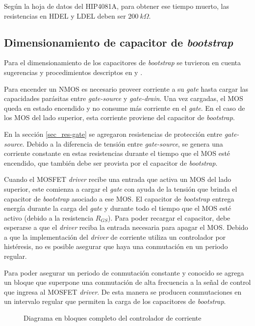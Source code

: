 \noindent Según la hoja de datos del HIP4081A, para obtener ese tiempo muerto, las resistencias en HDEL y LDEL deben ser $200\:k\Omega$.

\subsection{Dimensionamiento de capacitor de \textsl{bootstrap}}\label{sec_cap_bootstrap}

\noindent Para el dimensionamiento de los capacitores de \textsl{bootstrap} se tuvieron en cuenta sugerencias y procedimientos descriptos en \cite{HIP4081A_AN9405} y \cite{HIP4081A_FN3659}.

Para encender un NMOS es necesario proveer corriente a su \textsl{gate} hasta cargar las capacidades parásitas entre \textsl{gate-source} y \textsl{gate-drain}. Una vez cargadas, el MOS queda en estado encendido y no consume más corriente en el \textsl{gate}. En el caso de los MOS del lado superior, esta corriente proviene del capacitor de \textsl{bootstrap}.

En la sección \ref{sec_res-gate} se agregaron resistencias de protección entre \textsl{gate-source}. Debido a la diferencia de tensión entre \textsl{gate-source}, se genera una corriente constante en estas resistencias durante el tiempo que el MOS esté encendido, que también debe ser provista por el capacitor de \textsl{bootstrap}.

\noindent Cuando el MOSFET \textsl{driver} recibe una entrada que activa un MOS del lado superior, este comienza a cargar el \textsl{gate} con ayuda de la tensión que brinda el capacitor de \textsl{bootstrap} asociado a ese MOS. El capacitor de \textsl{bootstrap} entrega energía durante la carga del \textsl{gate} y durante todo el tiempo que el MOS esté activo (debido a la resistencia $R_{GS}$). Para poder recargar el capacitor, debe esperarse a que el \textsl{driver} reciba la entrada necesaria para apagar el MOS. Debido a que la implementación del \textsl{driver} de corriente utiliza un controlador por histéresis, no es posible asegurar que haya una conmutación en un periodo regular.

\noindent Para poder asegurar un periodo de conmutación constante y conocido se agrega un bloque que superpone una conmutación de alta frecuencia a la señal de control que ingresa al MOSFET \textsl{driver}. De esta manera se producen conmutaciones en un intervalo regular que permiten la carga de los capacitores de \textsl{bootstrap}. 

\begin{figure}[H]
	\centering
	\scalebox{0.8}{}
	\caption{Diagrama en bloques completo del controlador de corriente}	\label{fig:img_diag-en-bloques-con-oscilador}
\end{figure}

